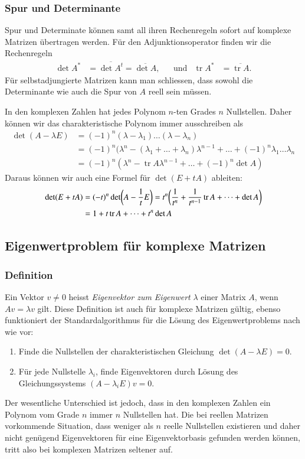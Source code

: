 \subsubsection{Spur und Determinante}
%
%
Spur und Determinate können samt all ihren Rechenregeln sofort auf
komplexe Matrizen übertragen werden.
Für den Adjunktionsoperator finden wir die Rechenregeln
\[
\begin{aligned}
\det A^*&= \overline{\det A^t}=\overline{\det A},
&&\text{und}&
\operatorname{tr} A^*&=\overline{\operatorname{tr}A}.
\end{aligned}
\]
Für selbstadjungierte Matrizen kann man schliessen, dass sowohl
die Determinante wie auch die Spur von $A$ reell sein müssen.

In den komplexen Zahlen hat jedes Polynom $n$-ten Grades $n$ Nullstellen.
Daher können wir das charakteristische Polynom immer ausschreiben als
\begin{align*}
\det(A-\lambda E)
&=
(-1)^n (\lambda-\lambda_1)\dots(\lambda-\lambda_n)
\\
&=
(-1)^n(\lambda^n -(\lambda_1+\dots+\lambda_n)\lambda^{n-1}+\dots
+(-1)^n\lambda_1\dots\lambda_n
\\
&=
(-1)^n(\lambda^n - \operatorname{tr}A\lambda^{n-1}+\dots + (-1)^n\det A)
\end{align*}
Daraus können wir auch eine Formel für $\det(E+tA)$ ableiten:
\begin{align}
\det(E+tA)
&=
(-t)^n\det\biggl(A-\frac1tE\biggr)
=
t^n\biggl(
\frac1{t^n}+\frac1{t^{n-1}}\operatorname{tr}A+\dots+\det A
\biggr)
\notag
\\
&=
1+t\operatorname{tr}A+\dots+t^n\operatorname{det}A
\label{skript:detandtrace}
\end{align}

%
%
\subsection{Eigenwertproblem für komplexe Matrizen}
\subsubsection{Definition}
Ein Vektor $v\ne 0$ heisst {\em Eigenvektor zum Eigenwert} $\lambda$ einer
Matrix $A$, wenn $Av=\lambda v$ gilt. Diese Definition ist auch für
komplexe Matrizen gültig, ebenso funktioniert der Standardalgorithmus
für die Lösung des Eigenwertproblems nach wie vor:
\begin{enumerate}
\item Finde die Nullstellen der charakteristischen Gleichung
$\det(A-\lambda E)=0$.
\item Für jede Nullstelle $\lambda_i$, finde Eigenvektoren
durch Lösung des Gleichungssystems $(A-\lambda_i E)v=0$.
\end{enumerate}
Der wesentliche Unterschied ist jedoch, dass in den komplexen
Zahlen ein Polynom vom Grade $n$ immer $n$ Nullstellen hat.
Die bei reellen Matrizen vorkommende Situation, dass weniger
als $n$ reelle Nullstellen existieren und daher nicht genügend
Eigenvektoren für eine Eigenvektorbasis gefunden werden können,
tritt also bei komplexen Matrizen seltener auf.

